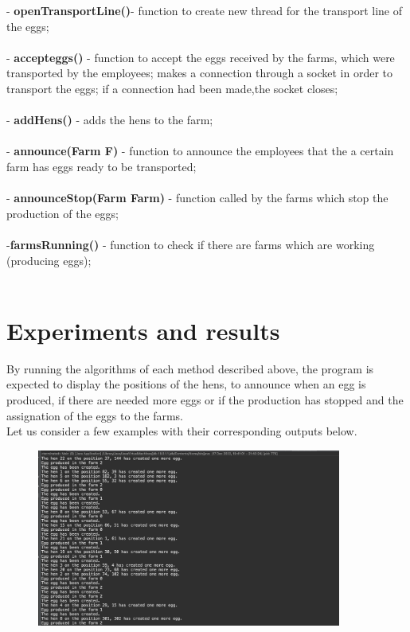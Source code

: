 \documentclass{article}
\begin{document}
\begin{itemize}
 - \textbf {openTransportLine()}- function to create new thread for the transport line of the eggs; \\  \\
 -  \textbf {accepteggs()} - function to accept the eggs received by the farms, which were transported by the employees; makes a connection through a socket in order to transport the eggs; if a connection had been made,the socket closes; \\  \\
 - \textbf {addHens()} - adds the hens to the farm; \\  \\
 - \textbf {announce(Farm F)} - function to announce the employees that the a certain farm has eggs ready to be  transported; \\  \\
 - \textbf {announceStop(Farm Farm)} - function called by the farms which stop the production of the eggs; \\  \\
 -\textbf {farmsRunning()} - function to check if there are farms which are working (producing eggs); \\ \\

\end{itemize}

\section{Experiments and results}
By running the algorithms of each method described above, the program is expected to display the positions of the hens, to announce when an egg is produced, if there are needed more eggs or if the production has stopped and the assignation of the eggs to the farms. \\
Let us consider a few examples with their corresponding outputs below.

\begin{figure}[htp]
    \centering
    \includegraphics[width=10cm]{Output1.png}
\end{figure}
\end{document}
